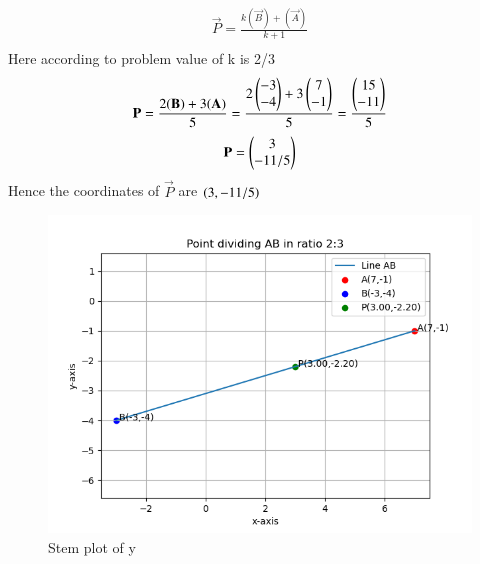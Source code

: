 \documentclass[journal]{IEEEtran}
\begin{document}
\begin{align}
\vec{P}=\frac{k(\vec{B})+(\vec{A})}{k+1}\\
\end{align}
Here according to problem value of k is 2/3\\
\begin{align}
\mathbf{P}=\frac{2(\mathbf{B})+3(\mathbf{A})}{5}=\frac{2\begin{pmatrix}-3\\-4\end{pmatrix}+3\begin{pmatrix}7\\-1\end{pmatrix}}{5}=\frac{\begin{pmatrix}15\\-11\end{pmatrix}}{5}\\
\end{align}
\begin{align}
\mathbf{P}=\begin{pmatrix}3\\-11/5\end{pmatrix}
\end{align}
Hence the coordinates of $\vec{P}$ are $\left(3,-11/5\right)$
\begin{figure}
    \centering
    \includegraphics[width=0.7\linewidth]{figs/plot.png}
    \caption{Stem plot of y}
    \label{stemplot}
\end{figure}
\end{document}
